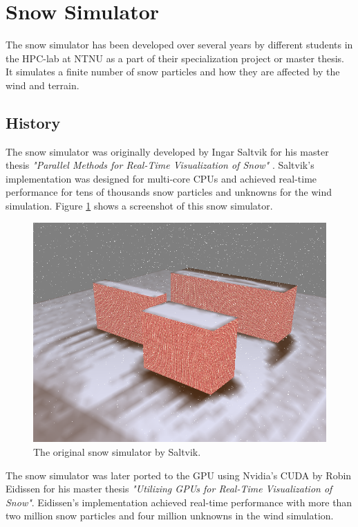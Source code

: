 \section{Snow Simulator}

The snow simulator has been developed over several years by different students in 
the HPC-lab at NTNU as a part of their specialization project or master thesis. 
It simulates a finite number of snow particles and how they are affected by the 
wind and terrain. 

\subsection{History}

The snow simulator was originally developed by Ingar Saltvik for his master
thesis \emph{"Parallel Methods for Real-Time Visualization of Snow"}
\cite{originalSnowThesis}. Saltvik's implementation was designed for multi-core
CPUs and achieved real-time performance for tens of thousands snow particles
and unknowns for the wind simulation. Figure \ref{fig:originalSnow} shows a 
screenshot of this snow simulator.

\begin{figure}[ht]
	\center
	\includegraphics[width=1.0\textwidth]{images/snow/serial/snow5}
	\caption{The original snow simulator by Saltvik.}
	\label{fig:originalSnow}
\end{figure}

The snow simulator was later ported to the GPU using Nvidia's CUDA by Robin
Eidissen for his master thesis \emph{"Utilizing GPUs for Real-Time Visualization
of Snow"}\cite{gpuSnowThesis}. Eidissen's implementation achieved real-time
performance with more than two million snow particles and four million unknowns
in the wind simulation.

